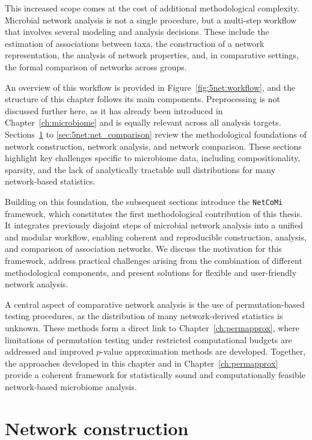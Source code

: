 This increased scope comes at the cost of additional methodological complexity. Microbial network analysis is not a single procedure, but a multi-step workflow that involves several modeling and analysis decisions. These include the estimation of associations between taxa, the construction of a network representation, the analysis of network properties, and, in comparative settings, the formal comparison of networks across groups.

An overview of this workflow is provided in Figure~\ref{fig:5net:workflow}, and the structure of this chapter follows its main components. Preprocessing is not discussed further here, as it has already been introduced in Chapter~\ref{ch:microbiome} and is equally relevant across all analysis targets. Sections~\ref{sec:5net:net_construction} to \ref{sec:5net:net_comparison} review the methodological foundations of network construction, network analysis, and network comparison. These sections highlight key challenges specific to microbiome data, including compositionality, sparsity, and the lack of analytically tractable null distributions for many network-based statistics.


Building on this foundation, the subsequent sections introduce the \texttt{NetCoMi} framework, which constitutes the first methodological contribution of this thesis. It integrates previously disjoint steps of microbial network analysis into a unified and modular workflow, enabling coherent and reproducible construction, analysis, and comparison of association networks. We discuss the motivation for this framework, address practical challenges arising from the combination of different methodological components, and present solutions for flexible and user-friendly network analysis.

A central aspect of comparative network analysis is the use of permutation-based testing procedures, as the distribution of many network-derived statistics is unknown. These methods form a direct link to Chapter~\ref{ch:permapprox}, where limitations of permutation testing under restricted computational budgets are addressed and improved $p$-value approximation methods are developed. Together, the approaches developed in this chapter and in Chapter~\ref{ch:permapprox} provide a coherent framework for statistically sound and computationally feasible network-based microbiome analysis.

\section{Network construction}
\label{sec:5net:net_construction}

